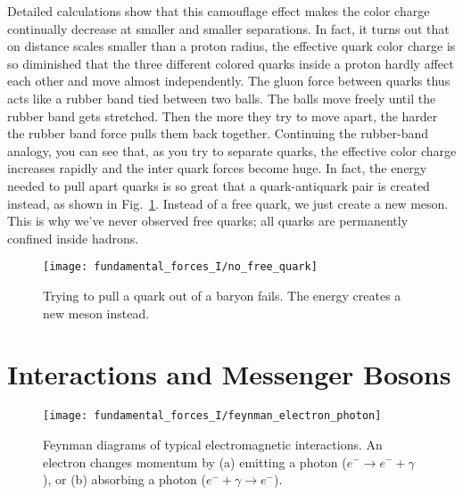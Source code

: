 Detailed calculations show that this camouflage effect makes the color
charge continually decrease at smaller and smaller separations.  In
fact, it turns out that on distance scales smaller than a proton
radius, the effective quark color charge is so diminished that the
three different colored quarks inside a proton hardly affect each
other and move almost independently. The gluon force between quarks
thus acts like a rubber band tied between two balls.  The balls move
freely until the rubber band gets stretched.  Then the more they try to
move apart, the harder the rubber band force pulls them back together.
Continuing the rubber-band analogy, you can see that, as you try to
separate quarks, the effective color charge increases rapidly and the
inter quark forces become huge.  In fact, the energy needed to pull
apart quarks is so great that a quark-antiquark pair is created
instead, as shown in Fig.~\ref{fig:no_free_quark}. Instead of a free
quark, we just create a new meson.  This is why we've never observed
free quarks; all quarks are permanently confined inside hadrons.

\begin{figure}[tbp]
\begin{center}
\texttt{[image: fundamental\_forces\_I/no\_free\_quark]}
\caption{Trying to pull a quark out of a baryon fails.  The energy
  creates a new meson instead.}
\label{fig:no_free_quark}
\end{center}
\end{figure}

\section{Interactions and Messenger Bosons}
\label{sec:interactions}

\begin{figure}[!b]
\begin{center}
\begin{minipage}{10cm}
\begin{center}
\texttt{[image: fundamental\_forces\_I/feynman\_electron\_photon]}
\caption{Feynman diagrams of typical electromagnetic interactions.
An electron changes momentum by (a) emitting a photon ($e^- \rightarrow
e^- + \gamma$), or (b) absorbing a photon ($e^- + \gamma \rightarrow e^-$).} 
\label{fig:feynman_electron_photon}
\end{center}
\end{minipage}
\end{center}
\end{figure}



